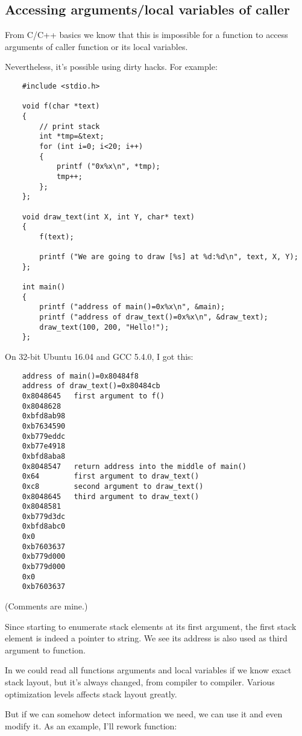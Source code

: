 \subsection{Accessing arguments/local variables of caller}

From C/C++ basics we know that this is impossible for a function to access arguments of caller function or its
local variables.

Nevertheless, it's possible using dirty hacks.
For example:

\begin{lstlisting}
	#include <stdio.h>

	void f(char *text)
	{
		// print stack
		int *tmp=&text;
		for (int i=0; i<20; i++)
		{
			printf ("0x%x\n", *tmp);
			tmp++;
		};
	};

	void draw_text(int X, int Y, char* text)
	{
		f(text);

		printf ("We are going to draw [%s] at %d:%d\n", text, X, Y);
	};

	int main()
	{
		printf ("address of main()=0x%x\n", &main);
		printf ("address of draw_text()=0x%x\n", &draw_text);
		draw_text(100, 200, "Hello!");
	};
\end{lstlisting}

On 32-bit Ubuntu 16.04 and GCC 5.4.0, I got this:

\begin{lstlisting}
	address of main()=0x80484f8
	address of draw_text()=0x80484cb
	0x8048645	first argument to f()
	0x8048628
	0xbfd8ab98
	0xb7634590
	0xb779eddc
	0xb77e4918
	0xbfd8aba8
	0x8048547	return address into the middle of main()
	0x64		first argument to draw_text()
	0xc8		second argument to draw_text()
	0x8048645	third argument to draw_text()
	0x8048581
	0xb779d3dc
	0xbfd8abc0
	0x0
	0xb7603637
	0xb779d000
	0xb779d000
	0x0
	0xb7603637
\end{lstlisting}

(Comments are mine.)

Since  starting to enumerate stack elements at its first argument, the first stack element is indeed a pointer
to  string. We see its address is also used as third argument to  function.

In  we could read all functions arguments and local variables if we know exact stack layout, but it's always
changed, from compiler to compiler.
Various optimization levels affects stack layout greatly.

But if we can somehow detect information we need, we can use it and even modify it.
As an example, I'll rework  function:

